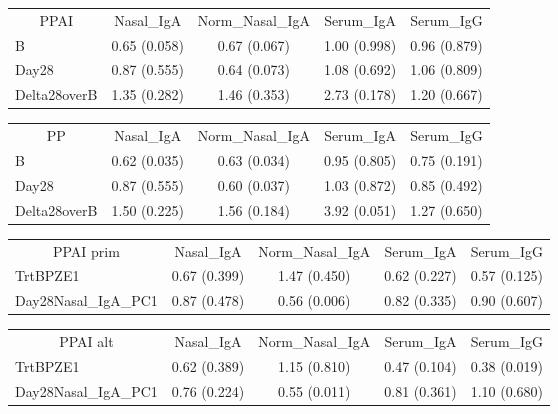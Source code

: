 \documentclass[
]{article}
\begin{document}
\begin{tabular}{>{}l|>{}c|>{}c|>{}c|c}
\hline
\multicolumn{1}{c|}{PPAI} & \multicolumn{1}{c|}{Nasal\_IgA} & \multicolumn{1}{c|}{Norm\_Nasal\_IgA} & \multicolumn{1}{c|}{Serum\_IgA} & \multicolumn{1}{c}{Serum\_IgG} \\
\cline{1-1} \cline{2-2} \cline{3-3} \cline{4-4} \cline{5-5}
B & 0.65 (0.058) & 0.67 (0.067) & 1.00 (0.998) & 0.96 (0.879)\\
\hline
Day28 & 0.87 (0.555) & 0.64 (0.073) & 1.08 (0.692) & 1.06 (0.809)\\
\hline
Delta28overB & 1.35 (0.282) & 1.46 (0.353) & 2.73 (0.178) & 1.20 (0.667)\\
\hline
\end{tabular}

\begin{tabular}{>{}l|>{}c|>{}c|>{}c|c}
\hline
\multicolumn{1}{c|}{PP} & \multicolumn{1}{c|}{Nasal\_IgA} & \multicolumn{1}{c|}{Norm\_Nasal\_IgA} & \multicolumn{1}{c|}{Serum\_IgA} & \multicolumn{1}{c}{Serum\_IgG} \\
\cline{1-1} \cline{2-2} \cline{3-3} \cline{4-4} \cline{5-5}
B & 0.62 (0.035) & 0.63 (0.034) & 0.95 (0.805) & 0.75 (0.191)\\
\hline
Day28 & 0.87 (0.555) & 0.60 (0.037) & 1.03 (0.872) & 0.85 (0.492)\\
\hline
Delta28overB & 1.50 (0.225) & 1.56 (0.184) & 3.92 (0.051) & 1.27 (0.650)\\
\hline
\end{tabular}

\begin{tabular}{>{}l|>{}c|>{}c|>{}c|c}
\hline
\multicolumn{1}{c|}{PPAI prim} & \multicolumn{1}{c|}{Nasal\_IgA} & \multicolumn{1}{c|}{Norm\_Nasal\_IgA} & \multicolumn{1}{c|}{Serum\_IgA} & \multicolumn{1}{c}{Serum\_IgG} \\
\cline{1-1} \cline{2-2} \cline{3-3} \cline{4-4} \cline{5-5}
TrtBPZE1 & 0.67 (0.399) & 1.47 (0.450) & 0.62 (0.227) & 0.57 (0.125)\\
\hline
Day28Nasal\_IgA\_PC1 & 0.87 (0.478) & 0.56 (0.006) & 0.82 (0.335) & 0.90 (0.607)\\
\hline
\end{tabular}

\begin{tabular}{>{}l|>{}c|>{}c|>{}c|c}
\hline
\multicolumn{1}{c|}{PPAI alt} & \multicolumn{1}{c|}{Nasal\_IgA} & \multicolumn{1}{c|}{Norm\_Nasal\_IgA} & \multicolumn{1}{c|}{Serum\_IgA} & \multicolumn{1}{c}{Serum\_IgG} \\
\cline{1-1} \cline{2-2} \cline{3-3} \cline{4-4} \cline{5-5}
TrtBPZE1 & 0.62 (0.389) & 1.15 (0.810) & 0.47 (0.104) & 0.38 (0.019)\\
\hline
Day28Nasal\_IgA\_PC1 & 0.76 (0.224) & 0.55 (0.011) & 0.81 (0.361) & 1.10 (0.680)\\
\hline
\end{tabular}
\end{document}
